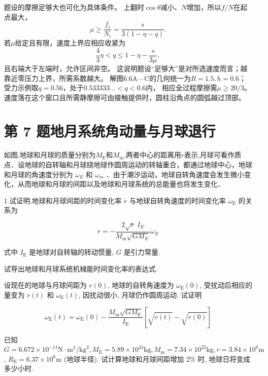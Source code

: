 \documentclass[UTF8,fontset=fandol,a4paper,11pt]{ctexart}
\newcommand{\tagline}[1]{\noindent{\small\color{muted}#1}\par}
\begin{document}
题设的摩擦足够大也可化为具体条件。
上翻时$\cos\theta$减小、$N$增加，所以$f/N$在起点最大，
\[
\mu\geq\frac{f_i}{N_i}
=\frac{s}{3(1-\eta-q)}.
\]
若$\mu$给定且有限，速度上界应相应收紧为
\[
\frac43\eta<q\leq1-\eta-\frac{s}{3\mu},
\]
且右端大于左端时，允许区间非空。
这说明题设“足够大”是对所选速度而言；越靠近零压力上界，所需系数越大。
解图6.6A—C的几何统一为$R=1.5,h=0.6$；
受力示例取$q=0.56$，处于$0.533333\ldots<q<0.6$内，
相应全过程摩擦需$\mu\geq20/3$。
速度落在这个窗口且所需静摩擦可由接触提供时，圆柱沿角点的圆弧越过顶部。




\section*{第 7 题\quad 地月系统角动量与月球退行}

\tagline{M-06-07}

如图,地球和月球的质量分别为\(M_{\mathrm{E}}\)和\(M_{\mathrm{m}}\),两者中心的距离用\(r\)表示,月球可看作质点．设地球的自转轴和月球绕地球作圆周运动的转轴重合，都通过地球中心，地球和月球的角速度分别为
\(\omega_{E}\) 和 \(\omega_{m}\)
．由于潮汐运动，地球自转角速度会发生微小变化，从而地球和月球的间距以及地球和月球系统的总能量也将发生变化．

1.试证明,地球和月球间距的时间变化率 \(\dot{r}\)
与地球自转角速度的时间变化率 \(\dot{\omega}_{\mathrm{E}}\) 的关系为

\[
\dot{ r } = - \frac{ 2 \sqrt{ r } \; I_{ E } } { M_{ \mathrm{m} } \sqrt{ G M_{ E } } } \dot{ \omega }_{ E }
\]

式中 \(I_{\mathrm{E}}\) 是地球对自转轴的转动惯量, \(G\) 是引力常量.

试导出地球和月球系统机械能时间变化率的表达式.

设现在的地球与月球间距为 \(r(0)\), 地球的自转角速度为
\(\omega_{\mathrm{E}}(0)\), 受扰动后相应的量变为 \(r(t)\) 和
\(\omega_{\mathrm{E}}(t)\), 因扰动很小, 月球仍作圆周运动. 试证明

\[
\omega_{ \mathrm{E} } ( t ) = \omega_{ \mathrm{E} } ( 0 ) - \frac{ M_{ \mathrm{m} } \sqrt{ G M_{ \mathrm{E} } } } { I_{ \mathrm{E} } } [ \sqrt{ r ( t ) } - \sqrt{ r ( 0 ) } ]
\]

已知
\(G=6.672 \times 10^{-11} \mathrm{N} \cdot \mathrm{m}^{2} / \mathrm{kg}^{2}, M_{\mathrm{E}}=5.89 \times 10^{24} \mathrm{kg}, M_{\mathrm{m}}=7.34 \times 10^{22} \mathrm{kg}, r=3.84 \times 10^{8} \mathrm{m}\),
\(R_{\mathrm{E}}=6.37 \times 10^{6} \mathrm{m}\) (地球半径).
试计算地球和月球间距增加 2\% 时, 地球日将变成多少小时.
\end{document}
